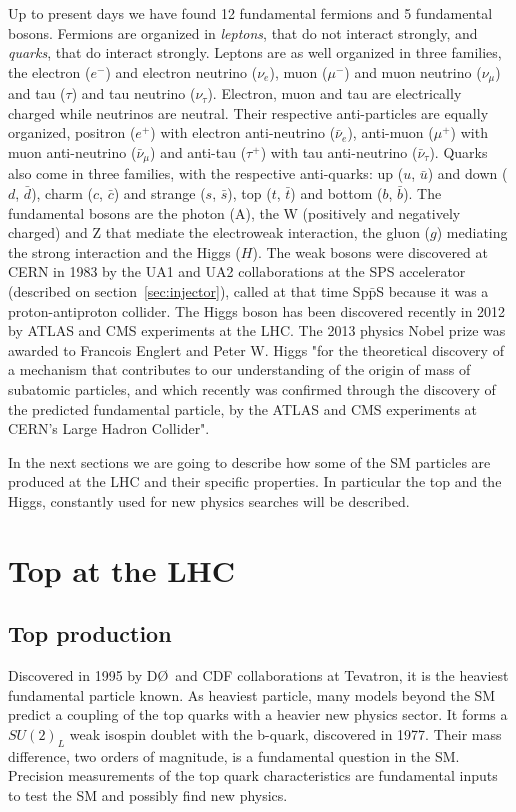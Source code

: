 Up to present days we have found 12 fundamental fermions and 5 fundamental bosons. Fermions are organized in \textit{leptons}, that do not interact strongly, and \textit{quarks}, that do interact strongly. Leptons are as well organized in three families, the electron ($e^{-}$) and electron neutrino ($\nu_{e}$), muon ($\mu^{-}$) and muon neutrino ($\nu_{\mu}$) and tau ($\tau$) and tau neutrino ($\nu_{\tau}$). Electron, muon and tau are electrically charged while neutrinos are neutral. Their respective anti-particles are equally organized, positron ($e^{+}$) with electron anti-neutrino ($\bar{\nu}_{e}$), anti-muon ($\mu^{+}$) with muon anti-neutrino ($\bar{\nu}_{\mu}$) and anti-tau ($\tau^{+}$) with tau anti-neutrino ($\bar{\nu}_{\tau}$). Quarks also come in three families, with the respective anti-quarks: up ($u$, $\bar{u}$) and down ($d$, $\bar{d}$), charm ($c$, $\bar{c}$) and strange ($s$, $\bar{s}$), top ($t$, $\bar{t}$) and bottom ($b$, $\bar{b}$). The fundamental bosons are the photon (A), the W (positively and negatively charged) and Z that mediate the electroweak interaction, the gluon ($g$) mediating the strong interaction and the Higgs ($H$). The weak bosons were discovered at CERN in 1983 by the UA1 and UA2 collaborations at the SPS accelerator (described on section~\ref{sec:injector}), called at that time Sp$\bar{\text{p}}$S because it was a proton-antiproton collider. The Higgs boson has been discovered recently in 2012 by ATLAS and CMS experiments at the LHC. The 2013 physics Nobel prize was awarded to Francois Englert and Peter W. Higgs "for the theoretical discovery of a mechanism that contributes to our understanding of the origin of mass of subatomic particles, and which recently was confirmed through the discovery of the predicted fundamental particle, by the ATLAS and CMS experiments at CERN's Large Hadron Collider".

In the next sections we are going to describe how some of the SM particles are produced at the LHC and their specific properties. In particular the top and the Higgs, constantly used for new physics searches will be described.

\section{Top at the LHC}
\subsection{Top production}

Discovered in 1995 by D\O~and CDF collaborations at Tevatron, it is the heaviest fundamental particle known. As heaviest particle, many models beyond the SM predict a coupling of the top quarks with a heavier new physics sector. It forms a $SU(2)_{L}$ weak isospin doublet with the b-quark, discovered in 1977. Their mass difference, two orders of magnitude, is a fundamental question in the SM. Precision measurements of the top quark characteristics are fundamental inputs to test the SM and possibly find new physics.

